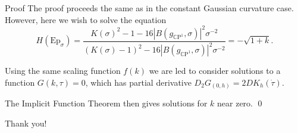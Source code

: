 \documentclass[professionalfont]{beamer}
\newcommand{\CP}{\mathbb{C}\mathrm{P}}
\begin{document}


\begin{frame}{Proof}
The proof proceeds the same as in the constant Gaussian curvature case. However, here we wish to solve the equation 
\[
H(\mathrm{Ep}_\sigma)
= \frac{K(\sigma)^2 - 1 - 16|B(g_{\CP^1},\sigma)|^2\sigma^{-2}}{(K(\sigma) - 1)^2 - 16|B(g_{\CP^1},\sigma)|^2\sigma^{-2}} = -\sqrt{1 + k}.
\]\pause

Using the same scaling function $f(k)$ we are led to consider solutions to a function $G(k,\tau) = 0$, which has partial derivative $D_2G_{(0,h)} = 2D K_h(\dot{\tau})$. 
\newline \pause


The Implicit Function Theorem then gives solutions for $k$ near zero. \qed

\end{frame}








\begin{frame}
\begin{center}
Thank you!
\end{center}
\end{frame}
\end{document}
